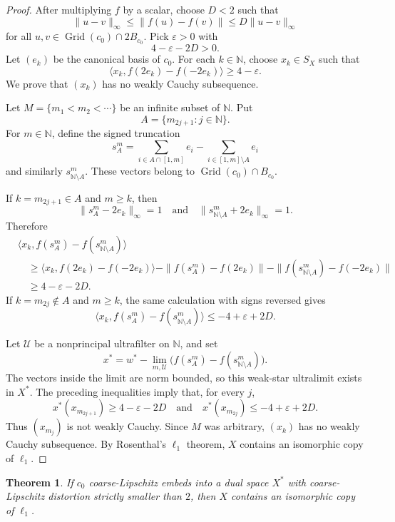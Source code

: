 \documentclass[11pt]{article}
\newtheorem{theorem}{Theorem}
\newcommand{\N}{\mathbb N}
\newcommand{\Grid}{\operatorname{Grid}}
\begin{document}
\begin{proof}
After multiplying \(f\) by a scalar, choose \(D<2\) such that
\[
  \|u-v\|_\infty \le \|f(u)-f(v)\|\le D\|u-v\|_\infty
\]
for all \(u,v\in \Grid(c_0)\cap 2B_{c_0}\).  Pick \(\varepsilon>0\) with
\[
  4-\varepsilon-2D>0.
\]
Let \((e_k)\) be the canonical basis of \(c_0\).  For each \(k\in\N\), choose
\(x_k\in S_X\) such that
\[
  \langle x_k, f(2e_k)-f(-2e_k)\rangle \ge 4-\varepsilon.
\]
We prove that \((x_k)\) has no weakly Cauchy subsequence.

Let \(M=\{m_1<m_2<\cdots\}\) be an infinite subset of \(\N\).  Put
\[
  A=\{m_{2j+1}:j\in\N\}.
\]
For \(m\in\N\), define the signed truncation
\[
  s_A^m=\sum_{i\in A\cap[1,m]}e_i-\sum_{i\in [1,m]\setminus A}e_i
\]
and similarly \(s_{\N\setminus A}^m\).  These vectors belong to
\(\Grid(c_0)\cap B_{c_0}\).

If \(k=m_{2j+1}\in A\) and \(m\ge k\), then
\[
  \|s_A^m-2e_k\|_\infty=1
  \quad\text{and}\quad
  \|s_{\N\setminus A}^m+2e_k\|_\infty=1.
\]
Therefore
\[
\begin{aligned}
  &\langle x_k, f(s_A^m)-f(s_{\N\setminus A}^m)\rangle \\
  &\quad\ge
  \langle x_k, f(2e_k)-f(-2e_k)\rangle
  -\|f(s_A^m)-f(2e_k)\|
  -\|f(s_{\N\setminus A}^m)-f(-2e_k)\|  \\
  &\quad\ge 4-\varepsilon-2D.
\end{aligned}
\]
If \(k=m_{2j}\notin A\) and \(m\ge k\), the same calculation with signs
reversed gives
\[
  \langle x_k, f(s_A^m)-f(s_{\N\setminus A}^m)\rangle
  \le -4+\varepsilon+2D.
\]

Let \(\mathcal U\) be a nonprincipal ultrafilter on \(\N\), and set
\[
  x^*=w^*\!-\!\lim_{m,\mathcal U}
  \bigl(f(s_A^m)-f(s_{\N\setminus A}^m)\bigr).
\]
The vectors inside the limit are norm bounded, so this weak-star ultralimit
exists in \(X^*\).  The preceding inequalities imply that, for every \(j\),
\[
  x^*(x_{m_{2j+1}})\ge 4-\varepsilon-2D
  \quad\text{and}\quad
  x^*(x_{m_{2j}})\le -4+\varepsilon+2D.
\]
Thus \((x_{m_j})\) is not weakly Cauchy.  Since \(M\) was arbitrary,
\((x_k)\) has no weakly Cauchy subsequence.  By Rosenthal's \(\ell_1\)
theorem, \(X\) contains an isomorphic copy of \(\ell_1\).
\end{proof}

\begin{theorem}\label{thm:coarse}
If \(c_0\) coarse-Lipschitz embeds into a dual space \(X^*\) with
coarse-Lipschitz distortion strictly smaller than \(2\), then \(X\) contains
an isomorphic copy of \(\ell_1\).
\end{theorem}
\end{document}
